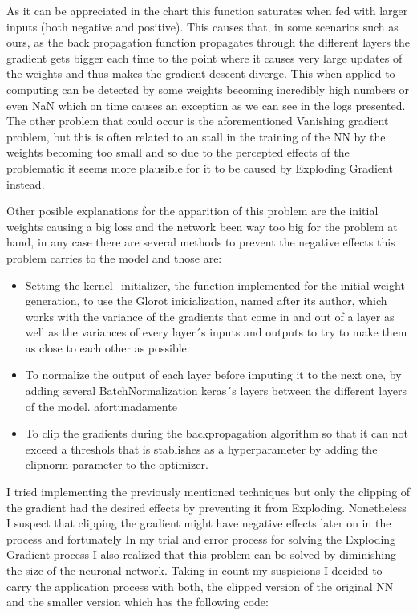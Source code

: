 \documentclass[12pt, a4paper]{article}
\begin{document}
	\vspace{5mm}
	
	As it can be appreciated in the chart this function saturates when fed with larger inputs (both negative and positive). This causes that, in some scenarios such as ours, as the back propagation function propagates through the different layers the gradient gets bigger each time to the point where it causes very large updates of the weights and thus makes the gradient descent diverge. This when applied to computing can be detected by some weights becoming incredibly high numbers or even NaN which on time causes an exception as we can see in the logs presented. The other problem that could occur is the aforementioned Vanishing gradient problem, but this is often related to an stall in the training of the NN by the weights becoming too small and so due to the percepted effects of the problematic it seems more plausible for it to be caused by Exploding Gradient instead.
	
	Other posible explanations for the apparition of this problem are the initial weights causing a big loss and the network been way too big for the problem at hand, in any case there are several methods to prevent the negative effects this problem carries to the model and those are:\cite{Vanishing}
	
	
	\begin{itemize}
		
		\item Setting the kernel\_initializer, the function implemented for the initial weight generation, to use the Glorot inicialization, named after its author, which works with the variance of the gradients that come in and out of a layer as well as the variances of every layer´s inputs and outputs to try to make them as close to each other as possible.
		
		\item To normalize the output of each layer before imputing it to the next one, by adding several BatchNormalization keras´s layers between the different layers of the model.
		afortunadamente
		\item To clip the gradients during the backpropagation algorithm so that it can not exceed a threshols that is stablishes as a hyperparameter by adding the clipnorm parameter to the optimizer.
		
	\end{itemize}

	I tried implementing the previously mentioned techniques but only the clipping of the gradient had the desired effects by preventing it from Exploding. Nonetheless I suspect that clipping the gradient might have negative effects later on in the process and 
	fortunately In my trial and error process for solving the Exploding Gradient process I also realized that this problem can be solved by diminishing the size of the neuronal network. Taking in count my suspicions I decided to carry the application process with both, the clipped version of the original NN and the smaller version which has the following code:
	
\end{document}
